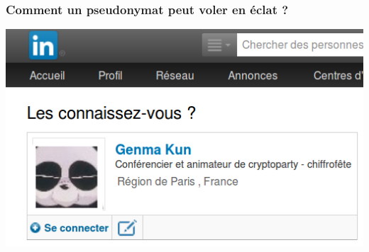 \documentclass{beamer}
\begin{document}
\begin{frame}
\frametitle{Comment un pseudonymat peut voler en éclat ?}
\begin{itemize}
\end{itemize}
\end{frame}

\begin{frame}
\begin{center}
\includegraphics[scale=0.7] {./images/attention_cookies_linkedin.png} 
\end{center}
\end{frame}
\end{document}
